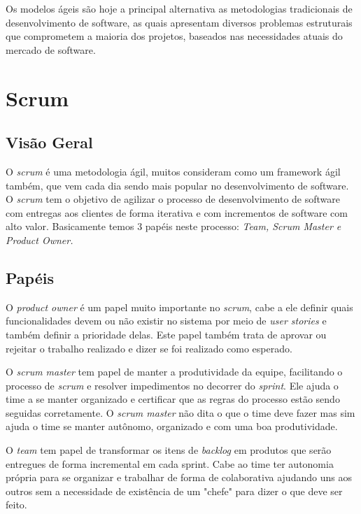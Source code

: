 \documentclass{abnt}
\begin{document}
		Os modelos ágeis são hoje a principal alternativa as metodologias tradicionais de desenvolvimento de software, 
		as quais apresentam diversos problemas estruturais que comprometem a maioria dos projetos, 
		baseados nas necessidades atuais do mercado de software.
	
	\section{Scrum}
	
		\subsection{Visão Geral}
			O \emph{scrum} é uma metodologia ágil, muitos consideram como um framework ágil também, que vem cada dia sendo mais popular
			no desenvolvimento de software. O \emph{scrum} tem o objetivo de agilizar o processo de desenvolvimento de software com entregas aos 
			clientes de forma iterativa e com incrementos de software com alto valor. Basicamente temos 3
			papéis neste processo: \emph{Team, Scrum Master e Product Owner.}
		
		\subsection{Papéis}
		
			O \emph{product owner} é um papel muito importante no \emph{scrum}, cabe a ele definir quais funcionalidades devem ou
			não existir no sistema por meio de \emph{user stories} e também definir a prioridade delas. Este papel também
			trata de aprovar ou rejeitar o trabalho realizado e dizer se foi realizado como esperado.
			
			O \emph{scrum master} tem papel de manter a produtividade da equipe, facilitando o processo de \emph{scrum} e resolver impedimentos
			no decorrer do \emph{sprint}. Ele ajuda o time a se manter organizado e certificar que as regras do processo estão sendo
			seguidas corretamente. O \emph{scrum master} não dita o que o time deve fazer mas sim ajuda o time se manter autônomo,
			organizado e com uma boa produtividade. 
			
			O \emph{team} tem papel de transformar os itens de \emph{backlog} em produtos que serão entregues de forma incremental em cada
			sprint. Cabe ao time ter autonomia própria para se organizar e trabalhar de forma de colaborativa ajudando uns aos
			outros sem a necessidade de existência de um "chefe" para dizer o que deve ser feito.
		
\end{document}
